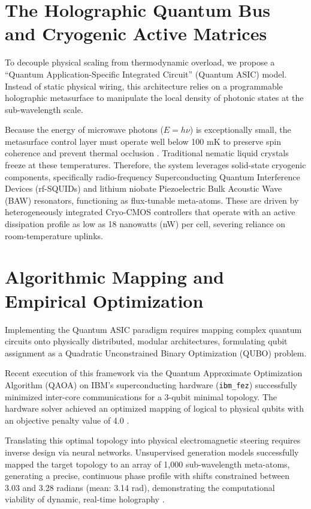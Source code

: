 \documentclass[11pt, a4paper]{article}
\begin{document}
\section{The Holographic Quantum Bus and Cryogenic Active Matrices}
To decouple physical scaling from thermodynamic overload, we propose a ``Quantum Application-Specific Integrated Circuit'' (Quantum ASIC) model. Instead of static physical wiring, this architecture relies on a programmable holographic metasurface to manipulate the local density of photonic states at the sub-wavelength scale.

Because the energy of microwave photons ($E = h\nu$) is exceptionally small, the metasurface control layer must operate well below 100 mK to preserve spin coherence and prevent thermal occlusion \cite{whitepaper_main}. Traditional nematic liquid crystals freeze at these temperatures. Therefore, the system leverages solid-state cryogenic components, specifically radio-frequency Superconducting Quantum Interference Devices (rf-SQUIDs) and lithium niobate Piezoelectric Bulk Acoustic Wave (BAW) resonators, functioning as flux-tunable meta-atoms. These are driven by heterogeneously integrated Cryo-CMOS controllers that operate with an active dissipation profile as low as 18 nanowatts (nW) per cell, severing reliance on room-temperature uplinks.

\section{Algorithmic Mapping and Empirical Optimization}
Implementing the Quantum ASIC paradigm requires mapping complex quantum circuits onto physically distributed, modular architectures, formulating qubit assignment as a Quadratic Unconstrained Binary Optimization (QUBO) problem.

Recent execution of this framework via the Quantum Approximate Optimization Algorithm (QAOA) on IBM's superconducting hardware (\texttt{ibm\_fez}) successfully minimized inter-core communications for a 3-qubit minimal topology. The hardware solver achieved an optimized mapping of logical to physical qubits with an objective penalty value of 4.0 \cite{routing_results}.

Translating this optimal topology into physical electromagnetic steering requires inverse design via neural networks. Unsupervised generation models successfully mapped the target topology to an array of 1,000 sub-wavelength meta-atoms, generating a precise, continuous phase profile with shifts constrained between 3.03 and 3.28 radians (mean: 3.14 rad), demonstrating the computational viability of dynamic, real-time holography \cite{nn_results}.
\end{document}
